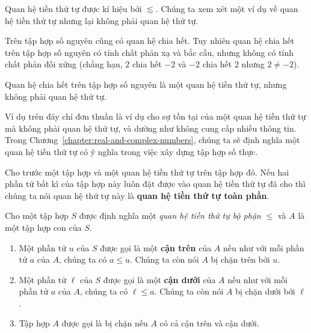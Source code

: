 Quan hệ tiền thứ tự được kí hiệu bởi $\lesssim$. Chúng ta xem xét một ví dụ về quan hệ tiền thứ tự nhưng lại không phải quan hệ thứ tự.

\begin{example}
    Trên tập hợp số nguyên cũng có quan hệ chia hết. Tuy nhiên quan hệ chia hết trên tập hợp số nguyên có tính chất phản xạ và bắc cầu, nhưng không có tính chất phản đối xứng (chẳng hạn, $2$ chia hết $-2$ và $-2$ chia hết $2$ nhưng $2\ne -2$).

    \noindent Quan hệ chia hết trên tập hợp số nguyên là một quan hệ tiền thứ tự, nhưng không phải quan hệ thứ tự.
\end{example}

Ví dụ trên đây chỉ đơn thuần là ví dụ cho sự tồn tại của một quan hệ tiền thứ tự mà không phải quan hệ thứ tự, và dường như không cung cấp nhiều thông tin. Trong Chương~\ref{chapter:real-and-complex-numbers}, chúng ta sẽ định nghĩa một quan hệ tiền thứ tự có ý nghĩa trong việc xây dựng tập hợp số thực.

\begin{definition}
    Cho trước một tập hợp và một quan hệ tiền thứ tự trên tập hợp đó. Nếu hai phần tử bất kì của tập hợp này luôn đặt được vào quan hệ tiền thứ tự đã cho thì chúng ta nói quan hệ thứ tự này là \textbf{quan hệ tiền thứ tự toàn phần}.
\end{definition}

\begin{definition}
    Cho một tập hợp $S$ được định nghĩa một \textit{quan hệ tiền thứ tự bộ phận} $\leq$ và $A$ là một tập hợp con của $S$.
    \begin{enumerate}[label={(\roman*)}]
        \item Một phần tử $u$ của $S$ được gọi là một \textbf{cận trên} của $A$ nếu như với mỗi phần tử $a$ của $A$, chúng ta có $a\leq u$. Chúng ta còn nói $A$ bị chặn trên bởi $u$.
        \item Một phần tử $\ell$ của $S$ được gọi là một \textbf{cận dưới} của $A$ nếu như với mỗi phần tử $a$ của $A$, chúng ta có $\ell\leq a$. Chúng ta còn nói $A$ bị chặn dưới bởi $\ell$.
        \item Tập hợp $A$ được gọi là bị chặn nếu $A$ có cả cận trên và cận dưới.
    \end{enumerate}
\end{definition}

